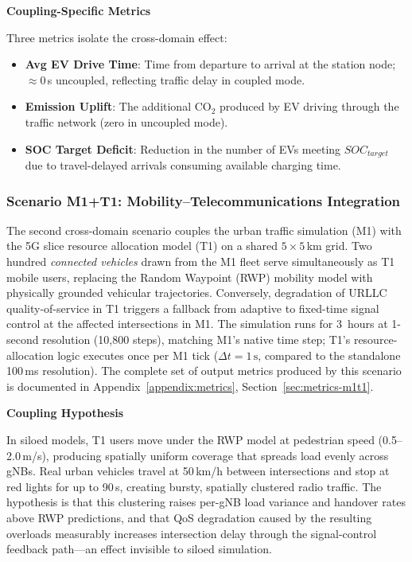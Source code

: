 \medskip\noindent\textbf{Coupling-Specific Metrics}

Three metrics isolate the cross-domain effect:
\begin{itemize}
    \item \textbf{Avg EV Drive Time}: Time from departure to arrival at the station node; $\approx 0$\,s uncoupled, reflecting traffic delay in coupled mode.
    \item \textbf{Emission Uplift}: The additional CO$_2$ produced by EV driving through the traffic network (zero in uncoupled mode).
    \item \textbf{SOC Target Deficit}: Reduction in the number of EVs meeting $SOC_{target}$ due to travel-delayed arrivals consuming available charging time.
\end{itemize}


\subsubsection{Scenario M1+T1: Mobility--Telecommunications Integration}
\label{sec:scenario-m1t1}

The second cross-domain scenario couples the urban traffic simulation (M1) with the 5G slice resource allocation model (T1) on a shared $5 \times 5$\,km grid. Two hundred \emph{connected vehicles} drawn from the M1 fleet serve simultaneously as T1 mobile users, replacing the Random Waypoint (RWP) mobility model with physically grounded vehicular trajectories. Conversely, degradation of URLLC quality-of-service in T1 triggers a fallback from adaptive to fixed-time signal control at the affected intersections in M1. The simulation runs for 3~hours at 1-second resolution (10{,}800 steps), matching M1's native time step; T1's resource-allocation logic executes once per M1 tick ($\Delta t = 1\,\text{s}$, compared to the standalone 100\,ms resolution). The complete set of output metrics produced by this scenario is documented in Appendix~\ref{appendix:metrics}, Section~\ref{sec:metrics-m1t1}.

\medskip\noindent\textbf{Coupling Hypothesis}

In siloed models, T1 users move under the RWP model at pedestrian speed (0.5--2.0\,m/s), producing spatially uniform coverage that spreads load evenly across gNBs. Real urban vehicles travel at 50\,km/h between intersections and stop at red lights for up to 90\,s, creating bursty, spatially clustered radio traffic. The hypothesis is that this clustering raises per-gNB load variance and handover rates above RWP predictions, and that QoS degradation caused by the resulting overloads measurably increases intersection delay through the signal-control feedback path---an effect invisible to siloed simulation.

